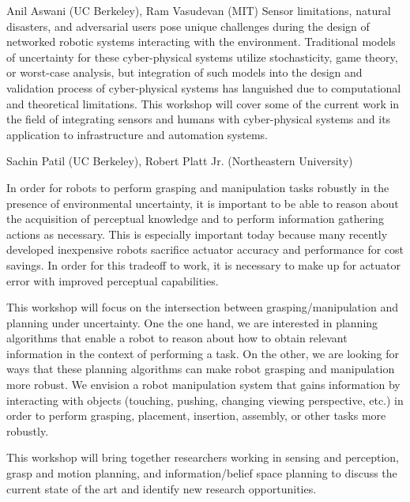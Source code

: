 \begin{spacing}{1.0}
{Anil Aswani (UC Berkeley), Ram Vasudevan (MIT)}
{
Sensor limitations, natural disasters, and adversarial users pose unique challenges during the design of networked robotic systems interacting with the environment. Traditional models of uncertainty for these cyber-physical systems utilize stochasticity, game theory, or worst-case analysis, but integration of such models into the design and validation process of cyber-physical systems has languished due to computational and theoretical limitations. This workshop will cover some of the current work in the field of integrating sensors and humans with cyber-physical systems and its application to infrastructure and automation systems.
}



{Sachin Patil (UC Berkeley), Robert Platt Jr. (Northeastern University)}
{
In order for robots to perform grasping and manipulation tasks robustly in the presence of environmental uncertainty, it is important to be able to reason about the acquisition of perceptual knowledge and to perform information gathering actions as necessary. This is especially important today because many recently developed inexpensive robots sacrifice actuator accuracy and performance for cost savings. In order for this tradeoff to work, it is necessary to make up for actuator error with improved perceptual capabilities.

This workshop will focus on the intersection between grasping/manipulation and planning under uncertainty. One the one hand, we are interested in planning algorithms that enable a robot to reason about how to obtain relevant information in the context of performing a task. On the other, we are looking for ways that these planning algorithms can make robot grasping and manipulation more robust. We envision a robot manipulation system that gains information by interacting with objects (touching, pushing, changing viewing perspective, etc.) in order to perform grasping, placement, insertion, assembly, or other tasks more robustly.

This workshop will bring together researchers working in sensing and perception, grasp and motion planning, and information/belief space planning to discuss the current state of the art and identify new research opportunities.
}



\end{spacing}
